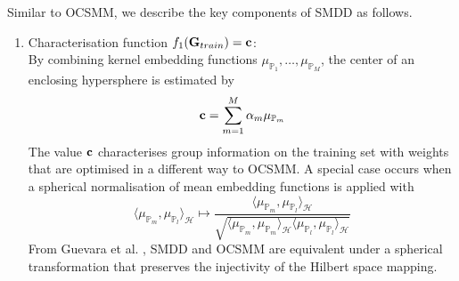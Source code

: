 



 

%
Similar to OCSMM, we describe the key components of SMDD as follows.
 \begin{enumerate}[1.]
\item Characterisation function $f_1({\bf G}_{train})= {\bf c}$: \\
 By combining kernel embedding functions  $\mu_{\mathbb{P}_1},\dots, \mu_{\mathbb{P}_M}$, the center of an enclosing hypersphere is estimated by  
\[{\bf c}= \sum_{m=1}^M \alpha_m  \mu_{\mathbb{P}_m}\] 
The value $\bf c$ characterises  group information on the training set with weights that are optimised in a different way to OCSMM. A special case occurs when a spherical normalisation of mean embedding functions is applied with   
\[  \langle \mu_{\mathbb{P}_m}, \mu_{\mathbb{P}_l}\rangle_\mathcal{H} \mapsto  \frac{ \langle \mu_{\mathbb{P}_m}, \mu_{\mathbb{P}_l}\rangle_\mathcal{H}} { \sqrt{\langle \mu_{\mathbb{P}_m}, \mu_{\mathbb{P}_m}\rangle_\mathcal{H}  \langle \mu_{\mathbb{P}_l}, \mu_{\mathbb{P}_l}\rangle_\mathcal{H}}} \]
From Guevara et al. \cite{SMDD},  SMDD and OCSMM are equivalent under a spherical transformation  that preserves the injectivity  of the Hilbert space mapping.
 \end{enumerate}
